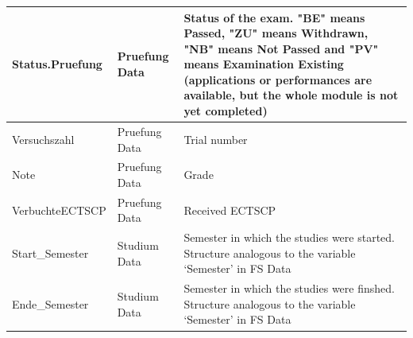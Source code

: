 \documentclass[11pt,a4paper]{article}
\begin{document}
\begin{longtable}{l|l|p{6cm}}
\hline
Status.Pruefung & Pruefung Data & Status of the exam. "BE" means Passed, "ZU" means Withdrawn, "NB" means Not Passed and "PV" means Examination Existing (applications or performances are available, but the whole module is not yet completed) \\
\hline
Versuchszahl & Pruefung Data & Trial number \\
\hline
Note & Pruefung Data & Grade \\
\hline
VerbuchteECTSCP & Pruefung Data & Received ECTSCP \\
\hline
Start\_Semester & Studium Data & Semester in which the studies were started. Structure analogous to the variable ‘Semester’ in FS Data \\
\hline
Ende\_Semester & Studium Data & Semester in which the studies were finshed. Structure analogous to the variable ‘Semester’ in FS Data
\label{tab_var}
\end{longtable}
\end{document}
